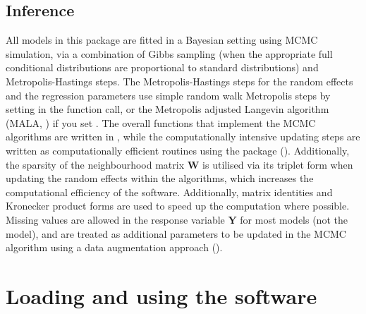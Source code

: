\documentclass[article,shortnames,nojss]{jss}
\begin{document}
\subsection{Inference}
All models in this package are fitted in a Bayesian setting using MCMC simulation, via a combination of Gibbs sampling (when the appropriate full conditional distributions are proportional to standard distributions) and Metropolis-Hastings steps. The Metropolis-Hastings steps for the random effects and the regression parameters  use simple random walk Metropolis steps by setting  in the function call, or the Metropolis adjusted Langevin algorithm (MALA, \citealp{roberts1998}) if you set . The overall functions that implement the MCMC algorithms are written in , while the computationally intensive updating steps are written as computationally efficient   routines using the  package  (\citealp{eddelbuettel2011}). Additionally, the sparsity of the neighbourhood matrix $\mathbf{W}$ is utilised via its triplet form when updating the random effects  within the algorithms, which increases the computational efficiency of the software. Additionally, matrix identities and Kronecker product forms are used to speed up the computation where possible. Missing values are allowed in the response variable $\mathbf{Y}$ for most models (not the  model), and are treated as additional parameters to be updated in the MCMC algorithm using a data augmentation approach (\citealp{tanner1987}).



\section{Loading and using the software}
\end{document}
